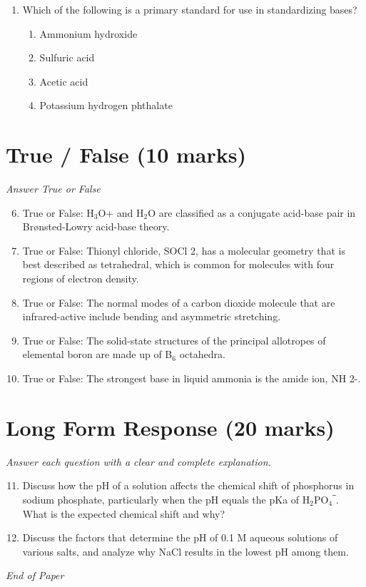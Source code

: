 \documentclass[12pt]{article}
\begin{document}
\begin{enumerate}[label=\arabic*.]
\begin{enumerate}[label=(\alph*)]
    \item a halogenated hydrocarbon
    \item lead
    \item mercury
\end{enumerate}
\item Which of the following is a primary standard for use in standardizing bases?
\begin{enumerate}[label=(\alph*)]
    \item Ammonium hydroxide
    \item Sulfuric acid
    \item Acetic acid
    \item Potassium hydrogen phthalate
\end{enumerate}
\end{enumerate}

\section*{True / False (10 marks)}
\textit{Answer True or False}
\begin{enumerate}[label=\arabic*.]
\setcounter{enumi}{5}
\item True or False: H$_{3}$O+ and H$_{2}$O are classified as a conjugate acid-base pair in Brønsted-Lowry acid-base theory.
\item True or False: Thionyl chloride, SOCl 2, has a molecular geometry that is best described as tetrahedral, which is common for molecules with four regions of electron density.
\item True or False: The normal modes of a carbon dioxide molecule that are infrared-active include bending and asymmetric stretching.
\item True or False: The solid-state structures of the principal allotropes of elemental boron are made up of B$_{6}$ octahedra.
\item True or False: The strongest base in liquid ammonia is the amide ion, NH 2-.
\end{enumerate}

\section*{Long Form Response (20 marks)}
\textit{Answer each question with a clear and complete explanation.}
\begin{enumerate}[label=\arabic*.]
\setcounter{enumi}{10}
\item Discuss how the pH of a solution affects the chemical shift of phosphorus in sodium phosphate, particularly when the pH equals the pKa of H$_{2}$PO$_{4}$‾. What is the expected chemical shift and why?
\item Discuss the factors that determine the pH of 0.1 M aqueous solutions of various salts, and analyze why NaCl results in the lowest pH among them.
\end{enumerate}

\vfill
\noindent\textit{End of Paper}
\end{document}
